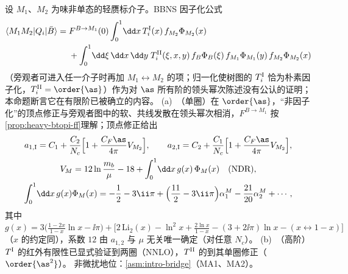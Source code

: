 \begin{proposition}\label{prop:heavy-qcdf-lp}
设 $M_1$、$M_2$ 为味非单态的轻赝标介子。BBNS 因子化公式
\begin{equation}\label{eq:heavy-qcdf}
\begin{split}
\langle M_1M_2|Q_i|\bar B\rangle={}&F^{B\to M_1}(0)\int_0^1\!\dd x\,T^{\rm I}_i(x)\,f_{M_2}\Phi_{M_2}(x)\\
&+\int_0^1\!\dd\xi\,\dd x\,\dd y\;T^{\rm II}_i(\xi,x,y)\,f_B\Phi_B(\xi)\,f_{M_1}\Phi_{M_1}(y)\,f_{M_2}\Phi_{M_2}(x)
\end{split}
\end{equation}
（旁观者可进入任一介子时再加 $M_1\leftrightarrow M_2$ 的项；归一化使树图的 $T^{\rm I}_i$ 恰为朴素因子化，$T^{\rm II}_i=\order{\as}$）作为对 $\as$ 所有阶的领头幂次陈述没有公认的证明；本命题断言它在有限阶已被确立的内容。
(a)~（单圈）在 $\order{\as}$，“非因子化”的顶点修正与旁观者图中的软、共线发散在领头幂次相消，$F^{B\to M_1}$ 按\cref{prop:heavy-btopi-ff}理解；顶点修正给出
\begin{gather}
a_{1,\rm I}=C_1+\frac{C_2}{N_c}\Big[1+\frac{C_F\as}{4\pi}V_{M_2}\Big],\qquad a_{2,\rm I}=C_2+\frac{C_1}{N_c}\Big[1+\frac{C_F\as}{4\pi}V_{M_2}\Big],\label{eq:heavy-ai}\\
V_M=12\ln\frac{m_b}{\mu}-18+\int_0^1\!\dd x\,g(x)\,\Phi_M(x)\quad(\text{NDR}),\label{eq:heavy-VM}\\
\int_0^1\!\dd x\,g(x)\Phi_M(x)=-\frac12-3\ii\pi+\Big(\frac{11}{2}-3\ii\pi\Big)\alpha_1^M-\frac{21}{20}\alpha_2^M+\cdots,\label{eq:heavy-gegen}
\end{gather}
其中 $g(x)=3\big(\frac{1-2x}{1-x}\ln x-\ii\pi\big)+\big[2\,\mathrm{Li}_2(x)-\ln^2x+\frac{2\ln x}{1-x}-(3+2\ii\pi)\ln x-(x\leftrightarrow1-x)\big]$（$x$ 的约定同\cite{BenekeEtAl2001}），系数 $12$ 由 $a_{1,2}$ 与 $\mu$ 无关唯一确定（对任意 $N_c$）。
(b)~（高阶）$T^{\rm I}$ 的红外有限性已显式验证到两圈（NNLO），$T^{\rm II}$ 的到其单圈修正（$\order{\as^2}$）。
非微扰地位：\cref{asm:intro-bridge}（MA1、MA2）。
\end{proposition}

